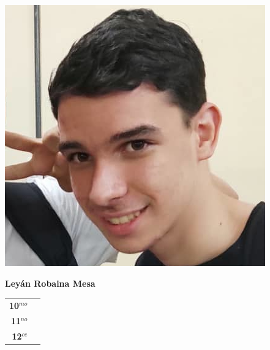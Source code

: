 \begin{minipage}{0.2\textwidth}
	\includegraphics[width=\linewidth]{img/concursantes/leyan.png} %
\end{minipage}
\hfill
\begin{minipage}{0.7\textwidth}
	\textbf{Leyán Robaina Mesa}
	
	\vspace*{0.1in}
	\begin{tabular}{rl}
		
		\textbf{10$^{mo}$} &   \\
		
		\textbf{11$^{no}$} &  \\
		
		\textbf{12$^{ce}$} &   \\
		
		
	\end{tabular}
\end{minipage}

